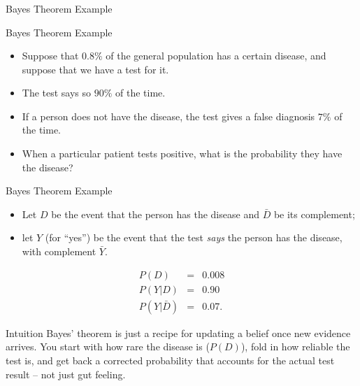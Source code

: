 
\begin{frame}[fragile]\frametitle{}
\begin{center}
{\Large Bayes Theorem Example}
\end{center}
\end{frame}


\begin{frame}{Bayes Theorem  Example }

\begin{itemize}
\item  Suppose that $0.8\%$ of the general population has a certain disease, and suppose that we have a test for it.
\item The test says so $90\%$ of the time. 
\item If a person does not have the disease, the test gives a false diagnosis $7\%$ of the time. 
\item When a particular patient tests positive, what is the probability they have the disease?
\end{itemize}
\end{frame}

\begin{frame}{Bayes Theorem  Example }

\begin{itemize}
\item   Let $D$ be the event that the person has the disease and $\bar{D}$ be its complement;
\item let $Y$ (for ``yes'') be the event that the test \emph{says} the person has the disease, with complement $\bar{Y}$.
\end{itemize}
\begin{eqnarray*}
	P(D)       &=& 0.008 \\
	P(Y|D)     &=& 0.90 \\
	P(Y|\bar{D}) &=& 0.07.
\end{eqnarray*}

\begin{block}{Intuition}
Bayes' theorem is just a recipe for updating a belief once new evidence arrives. You start with how rare the disease is ($P(D)$), fold in how reliable the test is, and get back a corrected probability that accounts for the actual test result -- not just gut feeling.
\end{block}
\end{frame}

